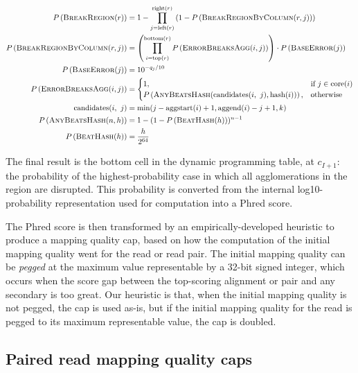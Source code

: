 \documentclass[11pt]{ucscthesis}
\newcommand{\rtop}[1]{\mathrm{top}(#1)}
\newcommand{\rbottom}[1]{\mathrm{bottom}(#1)}
\newcommand{\rleft}[1]{\mathrm{left}(#1)}
\newcommand{\rright}[1]{\mathrm{right}(#1)}
\newcommand{\core}[1]{\mathrm{core}(#1)}
\newcommand{\aggstart}[1]{\mathrm{aggstart}(#1)}
\newcommand{\aggend}[1]{\mathrm{aggend}(#1)}
\newcommand{\agghash}[1]{\mathrm{hash}(#1)}
\newcommand{\vocab}[1]{\emph{#1}}
\begin{document}
\begin{landscape}
\nopagebreak
\begin{align*}
    \Prob{\BreakRegion{r}} &= 1 - \prod_{j = \rleft{r}}^{\rright{r}}\left( 1 - \Prob{\BreakRegionByColumn{r}{j}}\right) \nonumber \\
    \Prob{\BreakRegionByColumn{r}{j}} &= \left(\prod_{i = \rtop{r}}^{\rbottom{r}} \Prob{\ErrorBreaksAgg{i}{j}}\right) \cdot \Prob{\BaseError{j}} \nonumber \\
    \Prob{\BaseError{j}} &= 10^{-q_j / 10} \nonumber \\
    \Prob{\ErrorBreaksAgg{i}{j}} &=
        \begin{cases}
            1, & \text{if } j \in \core{i} \\
            \Prob{\AnyBeatsHash{\candidates{i}{j}}{\agghash{i}}}, & \text{otherwise}
        \end{cases} \nonumber \\
    \candidates{i}{j} &= \min(j - \aggstart{i} + 1, \aggend{i} - j + 1, k) \nonumber \\
    \Prob{\AnyBeatsHash{n}{h}} &= 1 - (1 - \Prob{\BeatHash{h}})^{n - 1} \nonumber \\
    \Prob{\BeatHash{h}} &= \frac{h}{2^{64}} \nonumber
\end{align*}
\end{landscape}

The final result is the bottom cell in the dynamic programming table, at $c_{I+1}$: the probability of the highest-probability case in which all agglomerations in the region are disrupted. This probability is converted from the internal log10-probability representation used for computation into a Phred score.

The Phred score is then transformed by an empirically-developed heuristic to produce a mapping quality cap, based on how the computation of the initial mapping quality went for the read or read pair. The initial mapping quality can be \vocab{pegged} at the maximum value representable by a 32-bit signed integer, which occurs when the score gap between the top-scoring alignment or pair and any secondary is too great. Our heuristic is that, when the initial mapping quality is not pegged, the cap is used as-is, but if the initial mapping quality for the read is pegged to its maximum representable value, the cap is doubled.



\subsection{Paired read mapping quality caps}
\end{document}
